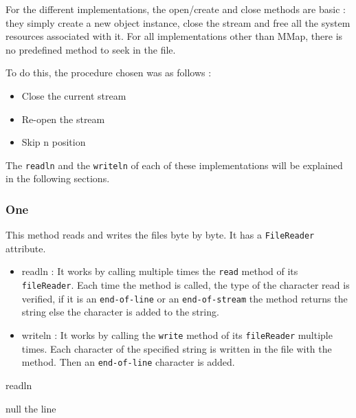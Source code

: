 \documentclass[12pt]{article}
\begin{document}
For the different implementations, the open/create and close methods are basic : they simply create a new object instance, close the stream and free all the system resources associated with it. For all implementations other than MMap, there is no predefined method to seek in the file. 

To do this, the procedure chosen was as follows :
\begin{itemize}
    \item Close the current stream
    \item Re-open the stream
    \item Skip n position
\end{itemize}

The \texttt{readln} and the \texttt{writeln} of each of these implementations will be explained in the following sections.

\subsubsection{One}
This method reads and writes the files byte by byte. It has a \texttt{FileReader} attribute.
\begin{itemize}
    \item readln : It works by calling multiple times the \texttt{read} method of its \texttt{fileReader}. Each time the method is called, the type of the character read is verified, if it is an \texttt{end-of-line} or an \texttt{end-of-stream} the method returns the string else the character is added to the string.

    \item writeln : It works by calling the \texttt{write} method of its \texttt{fileReader} multiple times. Each character of the specified string is written in the file with the method. Then an \texttt{end-of-line} character is added.

\end{itemize}

\begin{algorithm}[H]
\caption{readln}
\label{algo:1}
\begin{algorithmic}[1]
\RETURN null
\ELSE
{}
\ENDWHILE
\RETURN the line
\ENDIF
\end{algorithmic}
\end{algorithm}
\end{document}
